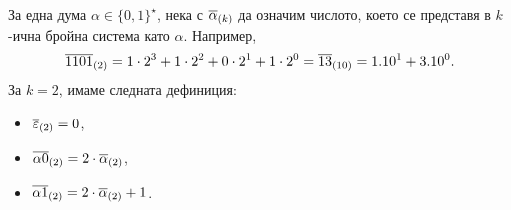 За една дума $\alpha \in \{0,1\}^\star$, 
нека с $\overline{\alpha}_{(k)}$ да означим числото, което се представя в $k$-ична бройна система като $\alpha$.
Например, 
\[\overline{1101}_{(2)} = 1 \cdot 2^3+1\cdot 2^2+0\cdot 2^1+1\cdot 2^0 = \overline{13}_{(10)} = 1.10^1 + 3.10^0.\]
За $k = 2$, имаме следната дефиниция:
\begin{itemize}
\item
  $\overline{\varepsilon}_{(2)} = 0$,
\item
  $\overline{\alpha 0}_{(2)} = 2\cdot \overline{\alpha}_{(2)}$,
\item
  $\overline{\alpha 1}_{(2)} = 2\cdot \overline{\alpha}_{(2)} + 1$.
\end{itemize}

